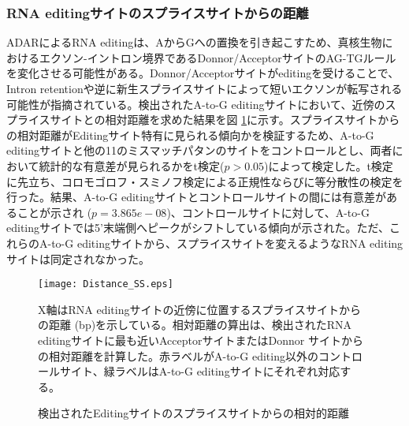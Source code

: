\subsubsection{RNA editingサイトのスプライスサイトからの距離}
ADARによるRNA editingは、AからGへの置換を引き起こすため、真核生物におけるエクソン-イントロン境界であるDonnor/AcceptorサイトのAG-TGルールを変化させる可能性がある。Donnor/Acceptorサイトがeditingを受けることで、Intron retentionや逆に新生スプライスサイトによって短いエクソンが転写される可能性が指摘されている。検出されたA-to-G editingサイトにおいて、近傍のスプライスサイトとの相対距離を求めた結果を図 \ref{fig:dist}に示す。スプライスサイトからの相対距離がEditingサイト特有に見られる傾向かを検証するため、A-to-G editingサイトと他の11のミスマッチパタンのサイトをコントロールとし、両者において統計的な有意差が見られるかをt検定($p>0.05$)によって検定した。t検定に先立ち、コロモゴロフ・スミノフ検定による正規性ならびに等分散性の検定を行った。結果、A-to-G editingサイトとコントロールサイトの間には有意差があることが示され ($p=3.865e−08$)、コントロールサイトに対して、A-to-G editingサイトでは5'末端側へピークがシフトしている傾向が示された。ただ、これらのA-to-G editingサイトから、スプライスサイトを変えるようなRNA editingサイトは同定されなかった。

\begin{figure}[!h]
	\centering
	\texttt{[image: Distance\_SS.eps]}
	\caption{検出されたEditingサイトのスプライスサイトからの相対的距離}
	\begin{flushleft}
		\small{X軸はRNA editingサイトの近傍に位置するスプライスサイトからの距離 (bp)を示している。相対距離の算出は、検出されたRNA editingサイトに最も近いAcceptorサイトまたはDonnor サイトからの相対距離を計算した。赤ラベルがA-to-G editing以外のコントロールサイト、緑ラベルはA-to-G editingサイトにそれぞれ対応する。}
	\end{flushleft}
	\label{fig:dist}
\end{figure}
		
